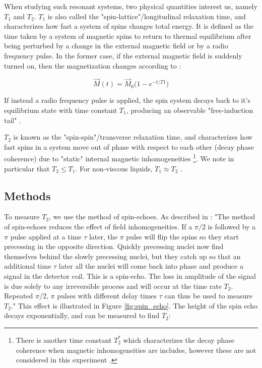 \documentclass[a4paper, 12pt]{article}  %
\begin{document}
When studying such resonant systems, two physical quantities interest us, namely $T_1$ and $T_2$. $T_1$ is also called the "spin-lattice"/longitudinal relaxation time, and characterizes how fast a system of spins changes total energy. It is defined as the time taken by a system of magnetic spins to return to thermal equilibrium after being perturbed by a change in the external magnetic field or by a radio frequency pulse. In the former case, if the external magnetic field is suddenly turned on, then the magnetization changes according to  \cite{Lab Manual}: 

\begin{equation*}
    \Vec{M}(t) = \Vec{M}_0 \big ( 1 - e^{-t/T1} \big )
\end{equation*}

If instead a radio frequency pulse is applied, the spin system decays back to it's equilibrium state with time constant $T_1$, producing an observable "free-induction tail" \cite{Lab Manual}. 
\newline

$T_2$ is known as the "spin-spin"/transverse relaxation time, and characterizes how fast spins in a system move out of phase with respect to each other (decay phase coherence) due to "static" internal magnetic inhomogeneities \footnote{There is another time constant $T^*_2$ which characterizes the decay phase coherence when magnetic inhomogeneities are includes, however these are not considered in this experiment \cite{Lab Manual}.}\cite{Lab Manual}. We note in particular that $T_2 \leq T_1$. For non-viscous liquids, $T_1 \approx T_2$ \cite{Lab Manual}. 

\subsection{Methods}\label{Methods}

To measure $T_2$, we use the method of spin-echoes. As described in \cite{Lab Manual}:
"The method of spin-echoes reduces the effect of field inhomogeneities. If a $\pi/2$ is
followed by a $\pi$ pulse applied at a time $\tau$ later, the $\pi$ pulse will flip the spins so they start precessing in the opposite direction. Quickly precessing nuclei now find themselves behind the slowly precessing nuclei, but they catch up so that an additional time $\tau$ later all the nuclei will come back into phase and produce a signal in the detector coil. This is a spin-echo. The loss in
amplitude of the signal is due solely to any irreversible process and will occur at the time rate $T_2$. Repeated $\pi/2$, $\pi$ pulses with different delay times $\tau$ can thus be used to measure $T_2$." This effect is illustrated in Figure \ref{fig:spin_echo}. The height of the spin echo decays exponentially, and can be measured to find $T_2$:
\end{document}
